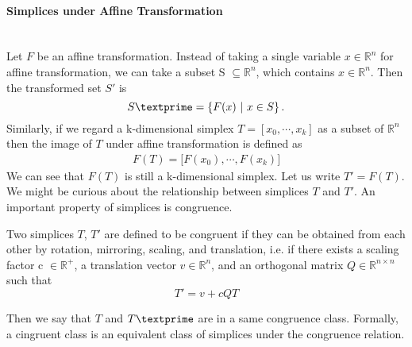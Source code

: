     \paragraph{Simplices under Affine Transformation}\mbox{}\\
    Let $F$ be an affine transformation. 
    Instead of taking a single variable $x\in\mathbb{R}^n$ for affine transformation, we can take a subset S $\subseteq\mathbb{R}^n$, which contains $x\in\mathbb{R}^n$. Then the transformed set $S'$ is
    \begin{equation*}
    S\textprime= \left\{{F}(x) ~|~ x\in S \right\}.
    \end{equation*}
    Similarly, if we regard a k-dimensional simplex ${T} = [{x_0, \cdots, x_k}]$ as a subset of $\mathbb{R}^n$ then the image of ${T}$ under affine transformation is defined as
    \begin{equation*}
    \begin{split}
    {F}({T}) = \big[{F}(x_0), \cdots , {F}(x_k)\big]
    \end{split}
    \end{equation*}
    We can see that $F(T)$ is still a k-dimensional simplex. Let us write $T' = F(T)$. We might be curious about the relationship between simplices $T$ and $T'$. 
    An important property of simplices is congruence.

    \begin{definition*}
    Two simplices $T$, $T'$ are defined to be congruent if they can be obtained from each other by rotation, mirroring, scaling, and translation, i.e. if there exists a scaling factor c $\in\mathbb{R}^{+}$, a translation vector $v\in\mathbb{R}^n$, and an orthogonal matrix $Q\in\mathbb{R}^{n\times n}$ such that
    \begin{equation*}
    T' = v + cQT
    \end{equation*}
    \end{definition*}
    \noindent
    Then we say that ${T}$ and ${T}\textprime$ are in a same congruence class. Formally, a cingruent class is an equivalent class of simplices under the congruence relation.